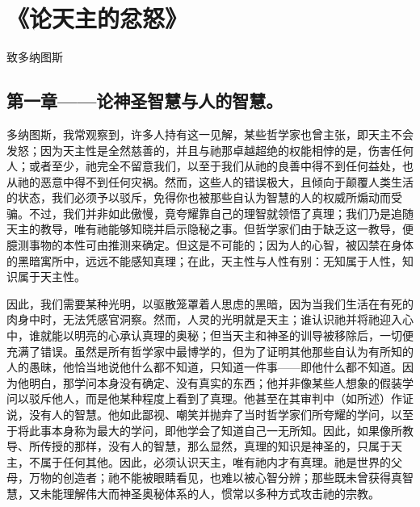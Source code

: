 
\chapter{《论天主的忿怒》}


致多纳图斯\par


\section{第一章——论神圣智慧与人的智慧。}

多纳图斯，我常观察到，许多人持有这一见解，某些哲学家也曾主张，即天主不会发怒；因为天主性是全然慈善的，并且与祂那卓越超绝的权能相悖的是，伤害任何人；或者至少，祂完全不留意我们，以至于我们从祂的良善中得不到任何益处，也从祂的恶意中得不到任何灾祸。然而，这些人的错误极大，且倾向于颠覆人类生活的状态，我们必须予以驳斥，免得你也被那些自认为智慧的人的权威所煽动而受骗。不过，我们并非如此傲慢，竟夸耀靠自己的理智就领悟了真理；我们乃是追随天主的教导，唯有祂能够知晓并启示隐秘之事。但哲学家们由于缺乏这一教导，便臆测事物的本性可由推测来确定。但这是不可能的；因为人的心智，被囚禁在身体的黑暗寓所中，远远不能感知真理；在此，天主性与人性有别：无知属于人性，知识属于天主性。\par

因此，我们需要某种光明，以驱散笼罩着人思虑的黑暗，因为当我们生活在有死的肉身中时，无法凭感官洞察。然而，人灵的光明就是天主；谁认识祂并将祂迎入心中，谁就能以明亮的心承认真理的奥秘；但当天主和神圣的训导被移除后，一切便充满了错误。虽然是所有哲学家中最博学的，但为了证明其他那些自认为有所知的人的愚昧，他恰当地说他什么都不知道，只知道一件事——即他什么都不知道。因为他明白，那学问本身没有确定、没有真实的东西；他并非像某些人想象的假装学问以驳斥他人，而是他某种程度上看到了真理。他甚至在其审判中（如所述）作证说，没有人的智慧。他如此鄙视、嘲笑并抛弃了当时哲学家们所夸耀的学问，以至于将此事本身称为最大的学问，即他学会了知道自己一无所知。因此，如果像所教导、所传授的那样，没有人的智慧，那么显然，真理的知识是神圣的，只属于天主，不属于任何其他。因此，必须认识天主，唯有祂内才有真理。祂是世界的父母，万物的创造者；祂不能被眼睛看见，也难以被心智分辨；那些既未曾获得真智慧，又未能理解伟大而神圣奥秘体系的人，惯常以多种方式攻击祂的宗教。\par

